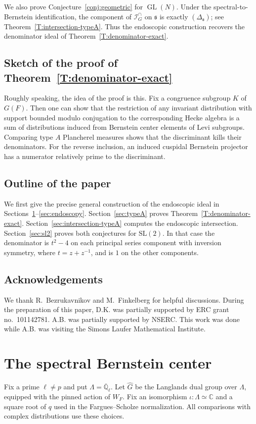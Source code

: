 \documentclass[11pt,a4paper]{amsart}
\newcommand{\Qbar}{\overline{\mathbb Q}_\ell}
\theoremstyle{definition}
\theoremstyle{remark}
\DeclareMathOperator{\GL}{GL}
\newcommand{\grs}{\mathfrak s}
\newcommand{\Icap}{\mathcal I^{\cap}}
\begin{document}
We also prove Conjecture~\ref{conj:geometric} for $\GL(N)$. Under
the spectral-to-Bernstein identification, the component of
$\Icap_G$ on $\grs$ is exactly $(\Delta_{\grs})$; see
Theorem~\ref{T:intersection-typeA}. Thus the endoscopic construction
recovers the denominator ideal of Theorem~\ref{T:denominator-exact}.

\subsection{Sketch of the proof of Theorem~\ref{T:denominator-exact}}
Roughly speaking, the idea of the proof is this. Fix a congruence subgroup $K$ of $G(F)$. Then one can show that the restriction of any invariant distribution with support bounded modulo conjugation to the corresponding Hecke algebra is a sum of distributions induced from Bernstein center elements of Levi subgroups. Comparing type $A$
Plancherel measures shows that the discriminant kills their
denominators. For the reverse
inclusion, an induced cuspidal Bernstein projector has a
numerator relatively prime to the discriminant.

\subsection{Outline of the paper}
We first give the precise general construction of the endoscopic
ideal in Sections~\ref{sec:spectral}--\ref{sec:endoscopy}.
Section~\ref{sec:typeA} proves Theorem~\ref{T:denominator-exact}.
Section~\ref{sec:intersection-typeA} computes the endoscopic
intersection.
Section~\ref{sec:sl2} proves both conjectures for $\mathrm{SL}(2)$.
In that case the denominator is $t^2-4$ on each principal series
component with inversion symmetry, where $t=z+z^{-1}$, and is $1$
on the other components. 

\subsection{Acknowledgements} We thank R.~Bezrukavnikov and M.~Finkelberg for helpful discussions. During the preparation of this paper, D.K. was partially supported by ERC grant no.~101142781. A.B. was partially supported by NSERC. This work was done while A.B. was visiting the Simons Laufer Mathematical Institute. 

\section{The spectral Bernstein center}\label{sec:spectral}
Fix a prime $\ell\ne p$ and put $\Lambda=\Qbar$. Let $\widehat G$ be the Langlands dual group over $\Lambda$, equipped with the pinned action of $W_F$. Fix an isomorphism $\iota:\Lambda\simeq\mathbb C$ and a square root of $q$ used in the Fargues--Scholze normalization. All comparisons with complex distributions use these choices.
\end{document}
